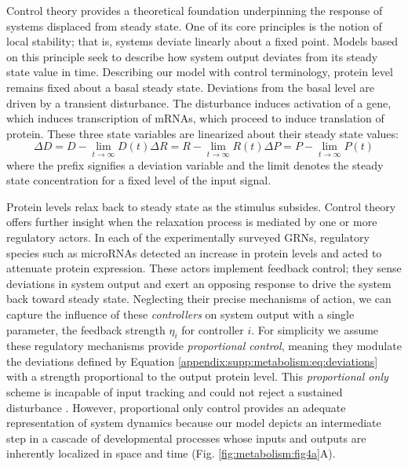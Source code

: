 Control theory provides a theoretical foundation underpinning the response of systems displaced from steady state. One of its core principles is the notion of local stability; that is, systems deviate linearly about a fixed point. Models based on this principle seek to describe how system output deviates from its steady state value in time. Describing our model with control terminology, protein level remains fixed about a basal steady state. Deviations from the basal level are driven by a transient disturbance. The disturbance induces activation of a gene, which induces transcription of mRNAs, which proceed to induce translation of protein. These three state variables are linearized about their steady state values:
\begin{equation}
\label{appendix:supp:metabolism:model:deviations}
\Delta D = D - \lim_{t \to \infty} D(t)
\Delta R = R - \lim_{t \to \infty} R(t)
\Delta P = P - \lim_{t \to \infty} P(t)
\end{equation}
where the prefix \Delta signifies a deviation variable and the limit denotes the steady state concentration for a fixed level of the input signal. 

Protein levels relax back to steady state as the stimulus subsides. Control theory offers further insight when the relaxation process is mediated by one or more regulatory actors. In each of the experimentally surveyed GRNs, regulatory species such as microRNAs detected an increase in protein levels and acted to attenuate protein expression. These actors implement feedback control; they sense deviations in system output and exert an opposing response to drive the system back toward steady state. Neglecting their precise mechanisms of action, we can capture the influence of these \emph{controllers} on system output with a single parameter, the feedback strength $\eta_i$ for controller $i$. For simplicity we assume these regulatory mechanisms provide \emph{proportional control}, meaning they modulate the deviations defined by Equation \ref{appendix:supp:metabolism:eq:deviations} with a strength proportional to the output protein level. This \emph{proportional only} scheme is incapable of input tracking and could not reject a sustained disturbance \cite{Yao2003}. However, proportional only control provides an adequate representation of system dynamics because our model depicts an intermediate step in a cascade of developmental processes whose inputs and outputs are inherently localized in space and time (Fig. \ref{fig:metabolism:fig4a}A).

